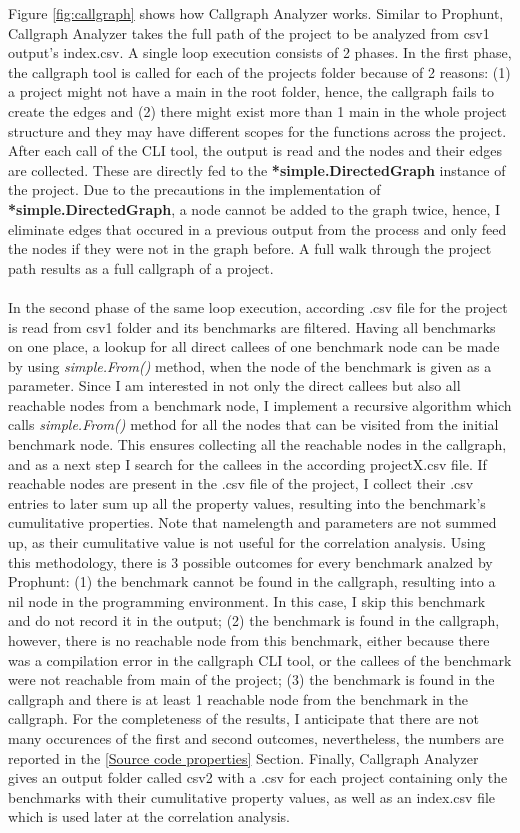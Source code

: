 \documentclass{seal_thesis}
\begin{document}
Figure \ref{fig:callgraph} shows how Callgraph Analyzer works. Similar to Prophunt, Callgraph Analyzer takes the full path of the project to be analyzed from csv1 output's index.csv. A single loop execution consists of 2 phases. In the first phase, the callgraph tool is called for each of the projects folder because of 2 reasons: (1) a project might not have a main in the root folder, hence, the callgraph fails to create the edges and (2) there might exist more than 1 main in the whole project structure and they may have different scopes for the functions across the project. After each call of the CLI tool, the output is read and the nodes and their edges are collected. These are directly fed to the \textbf{*simple.DirectedGraph} instance of the project. Due to the precautions in the implementation of \textbf{*simple.DirectedGraph}, a node cannot be added to the graph twice, hence, I eliminate edges that occured in a previous output from the process and only feed the nodes if they were not in the graph before. A full walk through the project path results as a full callgraph of a project.\\
\\
In the second phase of the same loop execution, according .csv file for the project is read from csv1 folder and its benchmarks are filtered. Having all benchmarks on one place, a lookup for all direct callees of one benchmark node can be made by using \textit{simple.From()} method, when the node of the benchmark is given as a parameter. Since I am interested in not only the direct callees but also all reachable nodes from a benchmark node, I implement a recursive algorithm which calls \textit{simple.From()} method for all the nodes that can be visited from the initial benchmark node. This ensures collecting all the reachable nodes in the callgraph, and as a next step I search for the callees in the according projectX.csv file. If reachable nodes are present in the .csv file of the project, I collect their .csv entries to later sum up all the property values, resulting into the benchmark's cumulitative properties. Note that namelength and parameters are not summed up, as their cumulitative value is not useful for the correlation analysis. Using this methodology, there is 3 possible outcomes for every benchmark analzed by Prophunt: (1) the benchmark cannot be found in the callgraph, resulting into a nil node in the programming environment. In this case, I skip this benchmark and do not record it in the output; (2) the benchmark is found in the callgraph, however, there is no reachable node from this benchmark, either because there was a compilation error in the callgraph CLI tool, or the callees of the benchmark were not reachable from main of the project; (3) the benchmark is found in the callgraph and there is at least 1 reachable node from the benchmark in the callgraph. For the completeness of the results, I anticipate that there are not many occurences of the first and second outcomes, nevertheless, the numbers are reported in the \ref{Source code properties} Section. Finally, Callgraph Analyzer gives an output folder called csv2 with a .csv for each project containing only the benchmarks with their cumulitative property values, as well as an index.csv file which is used later at the correlation analysis.
\end{document}

